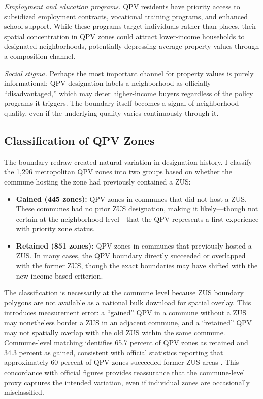 \documentclass[12pt]{article}
\begin{document}
\textit{Employment and education programs.} QPV residents have priority access to subsidized employment contracts, vocational training programs, and enhanced school support. While these programs target individuals rather than places, their spatial concentration in QPV zones could attract lower-income households to designated neighborhoods, potentially depressing average property values through a composition channel.

\textit{Social stigma.} Perhaps the most important channel for property values is purely informational: QPV designation labels a neighborhood as officially ``disadvantaged,'' which may deter higher-income buyers regardless of the policy programs it triggers. The boundary itself becomes a signal of neighborhood quality, even if the underlying quality varies continuously through it.

\subsection{Classification of QPV Zones}

The boundary redraw created natural variation in designation history. I classify the 1,296 metropolitan QPV zones into two groups based on whether the commune hosting the zone had previously contained a ZUS:

\begin{itemize}
    \item \textbf{Gained (445 zones):} QPV zones in communes that did not host a ZUS. These communes had no prior ZUS designation, making it likely---though not certain at the neighborhood level---that the QPV represents a first experience with priority zone status.
    \item \textbf{Retained (851 zones):} QPV zones in communes that previously hosted a ZUS. In many cases, the QPV boundary directly succeeded or overlapped with the former ZUS, though the exact boundaries may have shifted with the new income-based criterion.
\end{itemize}

The classification is necessarily at the commune level because ZUS boundary polygons are not available as a national bulk download for spatial overlay. This introduces measurement error: a ``gained'' QPV in a commune without a ZUS may nonetheless border a ZUS in an adjacent commune, and a ``retained'' QPV may not spatially overlap with the old ZUS within the same commune. Commune-level matching identifies 65.7 percent of QPV zones as retained and 34.3 percent as gained, consistent with official statistics reporting that approximately 60 percent of QPV zones succeeded former ZUS areas \citep{onpv2015rapport}. This concordance with official figures provides reassurance that the commune-level proxy captures the intended variation, even if individual zones are occasionally misclassified.
\end{document}
